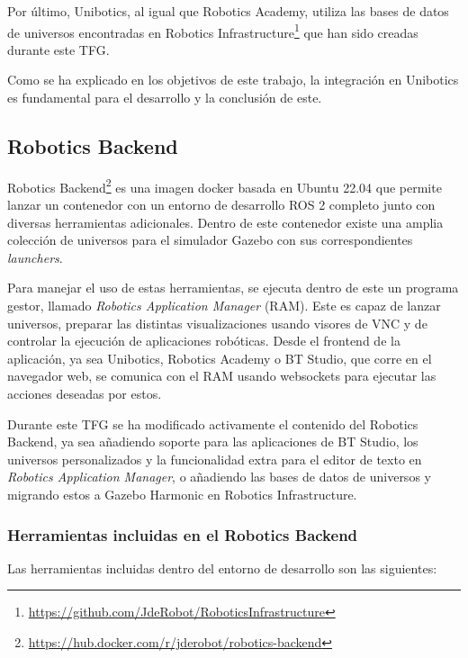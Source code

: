 Por último, Unibotics, al igual que Robotics Academy, utiliza las bases de datos de universos encontradas en Robotics Infrastructure\footnote{\url{https://github.com/JdeRobot/RoboticsInfrastructure}} que han sido creadas durante este TFG.

Como se ha explicado en los objetivos de este trabajo, la integración en Unibotics es fundamental para el desarrollo y la conclusión de este. 

\subsection{Robotics Backend}\label{sec:robotics-backend}

Robotics Backend\footnote{\url{https://hub.docker.com/r/jderobot/robotics-backend}} es una imagen docker basada en Ubuntu 22.04 que permite lanzar un contenedor con un entorno de desarrollo ROS 2 completo junto con diversas herramientas adicionales. Dentro de este contenedor existe una amplia colección de universos para el simulador Gazebo con sus correspondientes \textit{launchers}.

Para manejar el uso de estas herramientas, se ejecuta dentro de este un programa gestor, llamado \textit{Robotics Application Manager} (RAM). Este es capaz de lanzar universos, preparar las distintas visualizaciones usando visores de VNC y de controlar la ejecución de aplicaciones robóticas. Desde el frontend de la aplicación, ya sea Unibotics, Robotics Academy o BT Studio, que corre en el navegador web, se comunica con el RAM usando websockets para ejecutar las acciones deseadas por estos.

Durante este TFG se ha modificado activamente el contenido del Robotics Backend, ya sea añadiendo soporte para las aplicaciones de BT Studio, los universos personalizados y la funcionalidad extra para el editor de texto en \textit{Robotics Application Manager}, o añadiendo las bases de datos de universos y migrando estos a Gazebo Harmonic en Robotics Infrastructure. 

\subsubsection{Herramientas incluidas en el Robotics Backend}

Las herramientas incluidas dentro del entorno de desarrollo son las siguientes:

